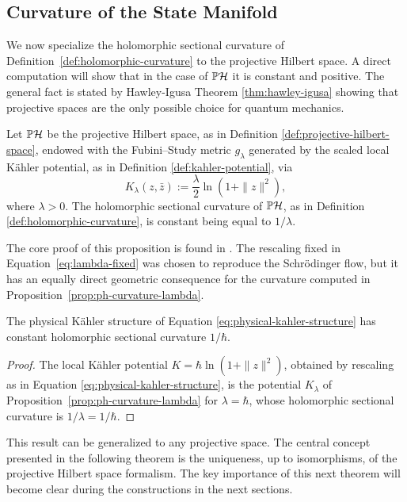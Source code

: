 \subsection*{Curvature of the State Manifold}

We now specialize the holomorphic sectional curvature of
Definition~\ref{def:holomorphic-curvature} to the projective Hilbert
space. A direct computation will show that in the case of $\PH$ it is constant and positive. The general fact is stated by Hawley-Igusa Theorem \ref{thm:hawley-igusa} showing that projective spaces are the only possible choice for quantum mechanics.

\begin{proposition}
	\label{prop:ph-curvature-lambda}
	Let $\PH$ be the projective Hilbert space, as in Definition \ref{def:projective-hilbert-space}, endowed with the Fubini--Study metric $g_\lambda$ generated by the scaled local Kähler potential, as in Definition \ref{def:kahler-potential}, via $$K_\lambda(z, \bar{z}) := \frac{\lambda}{2} \ln(1 + \|z\|^2),$$ where $\lambda > 0$. The holomorphic sectional curvature of $\PH$, as in Definition \ref{def:holomorphic-curvature}, is constant being equal to $1/\lambda$.
\end{proposition}

\noindent The core proof of this proposition is found in \cite[Section 4.5., p.120]{bengtssonGeometryQuantumStates2017}. The rescaling fixed in Equation~\eqref{eq:lambda-fixed} was chosen to reproduce the Schrödinger flow, but it has an equally direct geometric consequence for the curvature computed in Proposition~\ref{prop:ph-curvature-lambda}.

\begin{corollary}
	\label{cor:ph-curvature-hbar}
	The physical Kähler structure of Equation \eqref{eq:physical-kahler-structure} has constant holomorphic sectional curvature $1/\hbar$.
\end{corollary}
\begin{proof}
	The local Kähler potential $K=\hbar\ln(1+\|z\|^2)$, obtained by rescaling as in Equation \eqref{eq:physical-kahler-structure}, is the potential $K_\lambda$ of Proposition~\ref{prop:ph-curvature-lambda} for $\lambda=\hbar$, whose holomorphic sectional curvature is $1/\lambda=1/\hbar$.
\end{proof}

\noindent This result can be generalized to any projective space. The central concept presented in the following theorem is the uniqueness, up to isomorphisms, of the projective Hilbert space formalism. The key importance of this next theorem will become clear during the constructions in the next sections.

